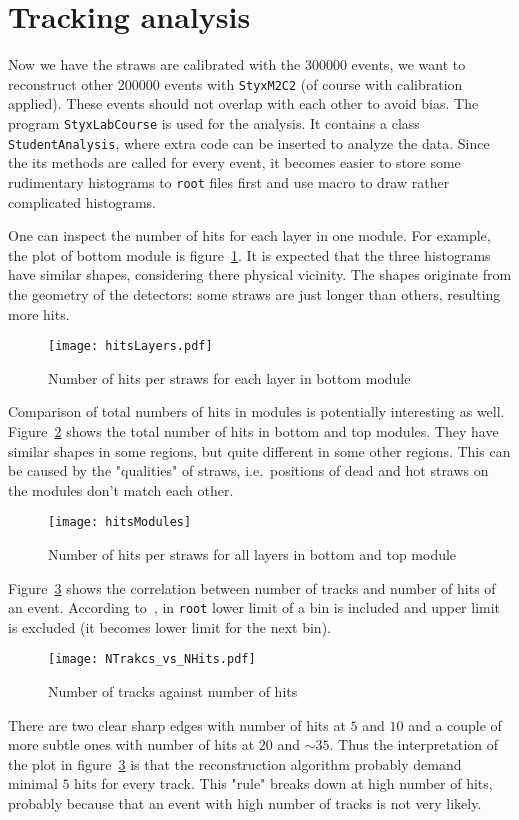 \clearpage
\section{Tracking analysis}\label{sec:ana}
Now we have the straws are calibrated with the \num{300 000} events, we want to reconstruct other \num{200 000} events with \verb|StyxM2C2| (of course with calibration applied). These events should not overlap with each other to avoid bias. The program \verb|StyxLabCourse| is used for the analysis. It contains a class \verb|StudentAnalysis|, where extra code can be inserted to analyze the data. Since the its methods are called for every event, it becomes easier to store some rudimentary histograms to \verb|root| files first and use macro to draw rather complicated histograms.

One can inspect the number of hits for each layer in one module. For example, the plot of bottom module is figure~\ref{fig:hitsLayers}. It is expected that the three histograms have similar shapes, considering there physical vicinity. The shapes originate from the geometry of the detectors: some straws are just longer than others, resulting more hits.
\begin{figure}[ht]
	\centering
	\texttt{[image: hitsLayers.pdf]}
	\caption{Number of hits per straws for each layer in bottom module}%
	\label{fig:hitsLayers}
\end{figure}

Comparison of total numbers of hits in modules is potentially interesting as well. Figure~\ref{fig:hitsModules} shows the total number of hits in bottom and top modules. They have similar shapes in some regions, but quite different in some other regions. This can be caused by the "qualities" of straws, i.e.~positions of dead and hot straws on the modules don't match each other.
\begin{figure}[H]
	\centering
	\texttt{[image: hitsModules]}
	\caption{Number of hits per straws for all layers in bottom and top module}
	\label{fig:hitsModules}
\end{figure}

Figure~\ref{fig:NTrakcs_vs_NHits} shows the correlation between number of tracks and number of hits of an event. According to~\cite{root-bins}, in \verb|root| lower limit of a bin is included and upper limit is excluded (it becomes lower limit for the next bin). 

\begin{figure}[ht]
	\centering
	\texttt{[image: NTrakcs\_vs\_NHits.pdf]}
	\caption{Number of tracks against number of hits}%
	\label{fig:NTrakcs_vs_NHits}
\end{figure}
There are two clear sharp edges with number of hits at $5$ and $10$ and a couple of more subtle ones with number of hits at $20$ and $\sim 35$. Thus the interpretation of the plot in figure~\ref{fig:NTrakcs_vs_NHits} is that the reconstruction algorithm probably demand minimal $5$ hits for every track. This "rule" breaks down at high number of hits, probably because that an event with high number of tracks is not very likely.

